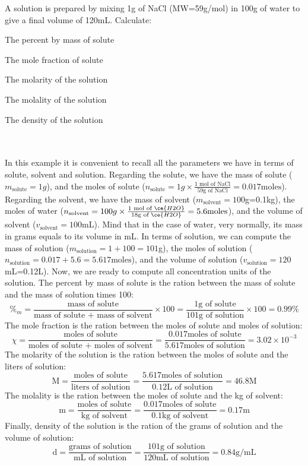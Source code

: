 \documentclass[main.tex]{subfiles}
\begin{document}
\begin{description}
\begin{example} %
A solution is prepared by mixing 1g of NaCl (MW=59g/mol) in 100g of water to give a final volume of 120mL. Calculate: 
\begin{inparaenum}[(a)]	
\item The percent by mass of solute
\item	 The mole fraction of solute 
\item  The molarity of the solution
\item  The molality of the solution
\item  The density of the solution
\end{inparaenum}\\
 \\
In this example it is convenient to recall all the parameters we have in terms of solute, solvent and solution. 
Regarding the solute, we have the mass of solute ($m_{\text{solute}}=1g$), and the moles of solute ($n_{\text{solute}}=1g\times \frac{\text{1 mol of NaCl}}{\text{59g of NaCl}}=0.017 \text{moles}$). Regarding the solvent, we have the mass of solvent ($m_{\text{solvent}}=100$g=0.1kg), the moles of water ($n_{\text{solvent}}=100g\times \frac{\text{1 mol of }\ce{H2O}}{\text{18g of }\ce{H2O}}=5.6 \text{moles}$), and the volume of solvent ($v_{\text{solvent}}=100$mL). Mind that in the case of water, very normally, its mass in grams equals to its volume in mL. In terms of solution, we can compute the mass of solution ($m_{\text{solution}}=1+100=101$g), the moles of solution ($n_{\text{solution}}=0.017+5.6=5.617\text{moles}$), and the volume of solution ($v_{\text{solution}}=120$mL=0.12L). Now, we are ready to compute all concentration units of the solution. The percent by mass of solute is the ration between the mass of solute and the mass of solution times 100:
\[\%_m=\frac{\text{mass of solute}}{\text{mass of solute + mass of solvent}}\times 100
=\frac{1\text{g of solute}}{101\text{g of solution}}\times 100=0.99\%\]
The mole fraction is the ration between the moles of solute and moles of solution:
\[\chi=\frac{\text{moles of solute}}{\text{moles of solute + moles of solvent}}
=\frac{0.017\text{moles of solute}}{5.617\text{moles of solution}}=3.02\times 10^{-3}	\]
The molarity of the solution is the ration between the moles of solute and the liters of solution:
\[\text{M}=\frac{\text{moles of solute}}{\text{liters of solution}}=\frac{5.617\text{moles of solution}}{0.12\text{L of solution}}=46.8\text{M}\]
The molality is the ration between the moles of solute and the kg of solvent:
\[	\text{m}=\frac{\text{moles of solute}}{\text{kg of solvent}} =\frac{0.017\text{moles of solute}}{0.1\text{kg of solvent}}=0.17\text{m}
	\]
Finally, density of the solution is the ration of the grams of solution and the volume of solution:
\[\text{d}=\frac{\text{grams of solution}}{\text{mL of solution}} = \frac{101\text{g of solution}}{120\text{mL of solution}}=0.84\text{g/mL}
	\]


\end{example}
\end{description}
\end{document}
